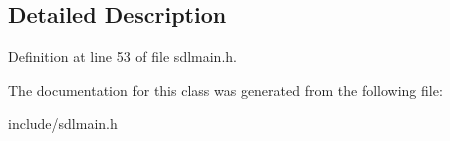 \subsection{Detailed Description}


Definition at line 53 of file sdlmain.\-h.



The documentation for this class was generated from the following file\-:\begin{DoxyCompactItemize}
\item 
include/sdlmain.\-h\end{DoxyCompactItemize}
